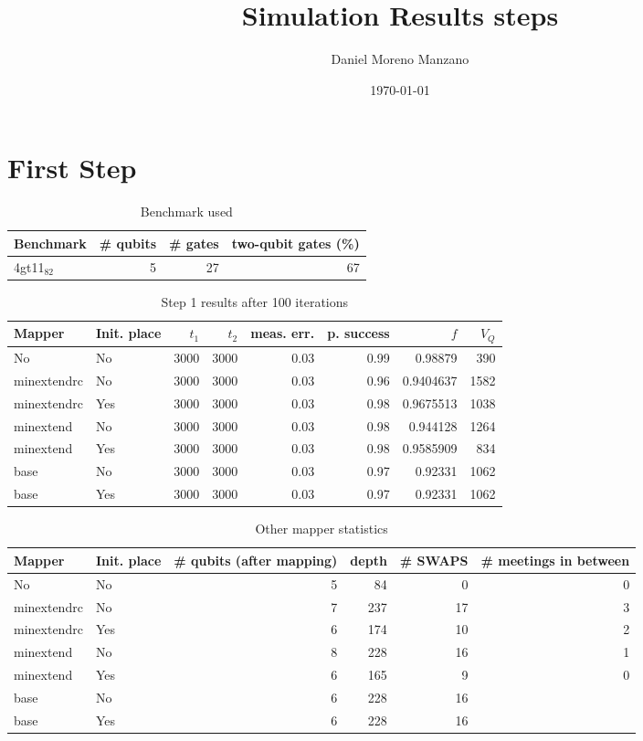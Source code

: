 \documentclass[11pt]{article}
\author{Daniel Moreno Manzano}
\date{\today}
\title{Simulation Results steps}
\begin{document}
\maketitle


\section{First Step}
\label{sec:orga5d042f}

\begin{table}[htbp]
\caption{\label{tab:org3615718}
Benchmark used}
\centering
\begin{tabular}{lrrr}
\hline
Benchmark & \# qubits & \# gates & two-qubit gates (\%)\\
\hline
4gt11\(_{\text{82}}\) & 5 & 27 & 67\\
\hline
\end{tabular}
\end{table}

\begin{table}[htbp]
\caption{\label{tab:org6a1608d}
Step 1 results after 100 iterations}
\centering
\begin{tabular}{llrrrrrr}
\hline
Mapper & Init. place & \(t_1\) & \(t_2\) & meas. err. & p. success & \(f\) & \(V_Q\)\\
\hline
No & No & 3000 & 3000 & 0.03 & 0.99 & 0.98879 & 390\\
\hline
minextendrc & No & 3000 & 3000 & 0.03 & 0.96 & 0.9404637 & 1582\\
minextendrc & Yes & 3000 & 3000 & 0.03 & 0.98 & 0.9675513 & 1038\\
minextend & No & 3000 & 3000 & 0.03 & 0.98 & 0.944128 & 1264\\
minextend & Yes & 3000 & 3000 & 0.03 & 0.98 & 0.9585909 & 834\\
base & No & 3000 & 3000 & 0.03 & 0.97 & 0.92331 & 1062\\
base & Yes & 3000 & 3000 & 0.03 & 0.97 & 0.92331 & 1062\\
\hline
\end{tabular}
\end{table}

\begin{table}[htbp]
\caption{\label{tab:org560eb0c}
Other mapper statistics}
\centering
\begin{tabular}{llrrrr}
\hline
Mapper & Init. place & \# qubits (after mapping) & depth & \# SWAPS & \# meetings in between\\
\hline
No & No & 5 & 84 & 0 & 0\\
\hline
minextendrc & No & 7 & 237 & 17 & 3\\
minextendrc & Yes & 6 & 174 & 10 & 2\\
minextend & No & 8 & 228 & 16 & 1\\
minextend & Yes & 6 & 165 & 9 & 0\\
base & No & 6 & 228 & 16 & \\
base & Yes & 6 & 228 & 16 & \\
\hline
\end{tabular}
\end{table}
\end{document}
